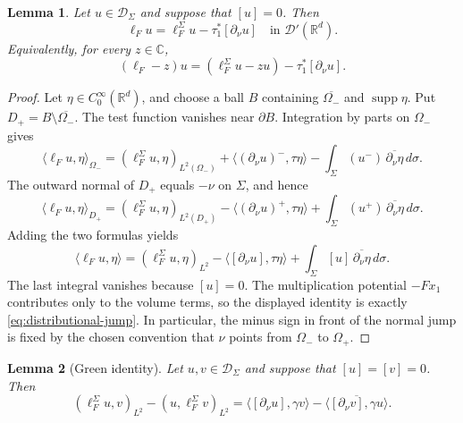 \documentclass[a4paper,11pt]{article}
\numberwithin{equation}{section}
\newtheorem{lem}{Lemma}[section]
\theoremstyle{remark}
\theoremstyle{definition}
\theoremstyle{remark}
\begin{document}
\begin{lem}\label{lem:distributional-jump}
Let $u\in\mathcal D_\Sigma$ and suppose that $[u]=0$.
Then
\begin{equation}\label{eq:distributional-jump}
\ell_Fu
=
\ell_F^\Sigma u-\tau_1^*[\partial_\nu u]
\quad\text{in }\mathcal D'(\mathbb R^d).
\end{equation}
Equivalently, for every $z\in\mathbb C$,
$$
(\ell_F-z)u
=
(\ell_F^\Sigma u-zu)-\tau_1^*[\partial_\nu u].
$$
\end{lem}

\begin{proof}
Let $\eta\in C_0^\infty(\mathbb R^d)$, and choose a ball $B$ containing $\overline{\Omega_-}$ and $\operatorname{supp}\eta$.
Put $D_+=B\setminus\overline{\Omega_-}$.
The test function vanishes near $\partial B$.
Integration by parts on $\Omega_-$ gives
$$
\langle\ell_Fu,\eta\rangle_{\Omega_-}
=(\ell_F^\Sigma u,\eta)_{L^2(\Omega_-)}
+\langle(\partial_\nu u)^-,\tau\eta\rangle
-\int_\Sigma (u^-)\,\overline{\partial_\nu\eta}\,d\sigma.
$$
The outward normal of $D_+$ equals $-\nu$ on $\Sigma$, and hence
$$
\langle\ell_Fu,\eta\rangle_{D_+}
=(\ell_F^\Sigma u,\eta)_{L^2(D_+)}
-\langle(\partial_\nu u)^+,\tau\eta\rangle
+\int_\Sigma (u^+)\,\overline{\partial_\nu\eta}\,d\sigma.
$$
Adding the two formulas yields
$$
\langle\ell_Fu,\eta\rangle
=
(\ell_F^\Sigma u,\eta)_{L^2}
-\langle[\partial_\nu u],\tau\eta\rangle
+\int_\Sigma [u]\,\overline{\partial_\nu\eta}\,d\sigma.
$$
The last integral vanishes because $[u]=0$.
The multiplication potential $-Fx_1$ contributes only to the volume terms, so the displayed identity is exactly \eqref{eq:distributional-jump}.
In particular, the minus sign in front of the normal jump is fixed by the chosen convention that $\nu$ points from $\Omega_-$ to $\Omega_+$.
\end{proof}

\begin{lem}[Green identity]\label{lem:green-transmission}
Let $u,v\in\mathcal D_\Sigma$ and suppose that $[u]=[v]=0$.
Then
\begin{equation}\label{eq:green-transmission}
(\ell_F^\Sigma u,v)_{L^2}
-(u,\ell_F^\Sigma v)_{L^2}
=
\langle[\partial_\nu u],\gamma v\rangle
-\overline{\langle[\partial_\nu v],\gamma u\rangle}.
\end{equation}
\end{lem}
\end{document}
